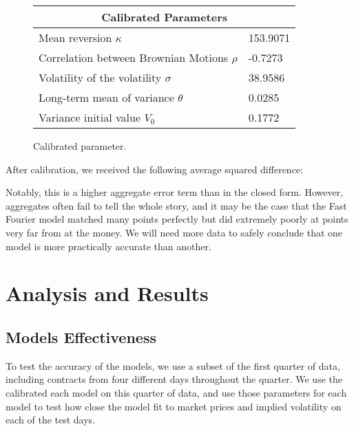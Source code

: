 \documentclass[fontsize=12pt]{article}
\numberwithin{equation}{section} %
\numberwithin{figure}{section} %
\numberwithin{table}{section} %
\begin{document}
\begin{figure}[H]
\centering
\begin{tabular}{| p{6.5cm}| p{2.0cm} |}
\hline
\multicolumn{2}{|c|}{Calibrated Parameters} \\
\hline
Mean reversion $\kappa$ & 153.9071 \\ \hline
Correlation between Brownian Motions $\rho$ & -0.7273 \\ \hline
Volatility of the volatility $\sigma$ & 38.9586 \\ \hline
Long-term mean of variance $\theta$ & 0.0285 \\ \hline
Variance initial value $V_0$ & 0.1772 \\ \hline
\end{tabular}
\caption{Calibrated parameter.}
\label{tabla:Calibrated Parameters FFT}
\end{figure}

After calibration, we received the following average squared difference:

\begin{center}
\end{center}

Notably, this is a higher aggregate error term than in the closed form. However, aggregates often fail to tell the whole story, and it may be the case that the Fast Fourier model matched many points perfectly but did extremely poorly at points very far from at the money. We will need more data to safely conclude that one model is more practically accurate than another.

\section{Analysis and Results} \label{Analysis and Results}



\subsection{Models Effectiveness} \label{Models Effectiveness}

To test the accuracy of the models, we use a subset of the first quarter of data, including contracts from four different days throughout the quarter. We use the calibrated each model on this quarter of data, and use those parameters for each model to test how close the model fit to market prices and implied volatility on each of the test days.
\end{document}
